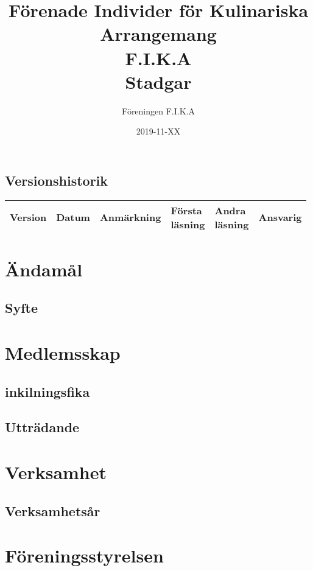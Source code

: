 \documentclass{article}
\title{Förenade Individer för Kulinariska Arrangemang \\
                F.I.K.A \\
                Stadgar}
\author{Föreningen F.I.K.A}
\date{2019-11-XX}
\begin{document}
\maketitle
\newpage

\subsection*{Versionshistorik}

\begin{tabularx}{\textwidth}{|l|l|X|l|l|l|}
\hline
Version & Datum & Anmärkning & \makecell{Första\\läsning} & \makecell{Andra\\läsning} & Ansvarig \\
\hline
\end{tabularx}
\newpage

\tableofcontents
\newpage
{}

\section{Ändamål}
\subsection{Syfte}

\section{Medlemsskap}
\subsection{inkilningsfika}

\subsection{Utträdande}

\section{Verksamhet}
\subsection{Verksamhetsår}

\section{Föreningsstyrelsen}
\end{document}
